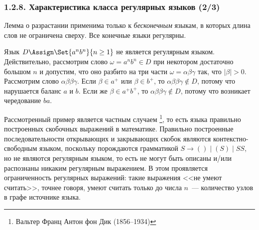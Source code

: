 \begin{frame}
\frametitle{1.2.8. Характеристика класса регулярных языков (2/3) }

\begin{remark}
Лемма о разрастании применима только к {\em бесконечным} языкам,
в которых длина слов не ограничена сверху.
Все конечные языки регулярны.   
\end{remark}

\begin{example}
Язык $D\Assign\Set{a^nb^n}{n\ge 1}$ не является регулярным языком.
Действительно, рассмотрим слово $\omega=a^nb^n \in D$ при некотором 
достаточно большом $n$
и допустим, что оно разбито на три части $\omega=\alpha\beta\gamma$ так,
что $|\beta|>0$. Рассмотрим слово $\alpha\beta\beta\gamma$.
Если $\beta\in a^+$ или $\beta\in b^+$, то
$\alpha\beta\beta\gamma\not\in D$, потому что нарушается баланс $a$ и $b$.
Если же $\beta\in a^+b^+$, то
$\alpha\beta\beta\gamma\not\in D$, потому что возникает чередование $ba$.
\end{example}

\begin{digress}
Рассмотренный пример является частным случаем 
\footnote{Вальтер Франц Антон фон Дик (1856--1934)},
то есть языка правильно построенных скобочных выражений в математике.
Правильно построенные последовательности открывающих и закрывающих скобок
являются контекстно-свободным языком, поскольку порождаются грамматикой
$S\to ()\mid(S)\mid SS$, но не являются регулярным языком, то есть не могут быть 
описаны и/или распознаны никаким регулярным выражением.
В этом проявляется ограниченность регулярных выражений: такие выражения
<<не умеют считать>>, точнее говоря, умеют считать только до числа $n$~--- количество
узлов в графе источнике языка.
\end{digress}
\end{frame}


